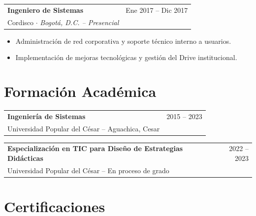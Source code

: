 \documentclass[10pt, letterpaper]{article}
\makeatletter
\newcommand{\cventry}[5]{%
  \noindent
  \begin{tabularx}{\linewidth}{@{}X r@{}}
    {\bfseries\color{primary} #1} & {\small\color{medgray} #2} \\
    {\small\color{accent} #3} $\cdot$ {\small\color{darkgray}\itshape #4} & \\
  \end{tabularx}
  \vspace{2pt}
  #5
  \vspace{6pt}
}
\makeatother
\begin{document}
\cventry
  {Ingeniero de Sistemas}
  {Ene 2017 – Dic 2017}
  {Cordisco}
  {Bogotá, D.C. – Presencial}
  {
    \begin{itemize}
      \item Administración de red corporativa y soporte técnico interno a usuarios.
      \item Implementación de mejoras tecnológicas y gestión del Drive institucional.
    \end{itemize}
  }

\section{Formación Académica}

\noindent
\begin{tabularx}{\linewidth}{@{}X r@{}}
  {\bfseries\color{primary} Ingeniería de Sistemas} & {\small\color{medgray} 2015 – 2023} \\
  {\small\color{darkgray} Universidad Popular del César – Aguachica, Cesar} & \\
\end{tabularx}

\vspace{4pt}

\noindent
\begin{tabularx}{\linewidth}{@{}X r@{}}
  {\bfseries\color{primary} Especialización en TIC para Diseño de Estrategias Didácticas} & {\small\color{medgray} 2022 – 2023} \\
  {\small\color{darkgray} Universidad Popular del César – En proceso de grado} & \\
\end{tabularx}

\section{Certificaciones}
\end{document}
